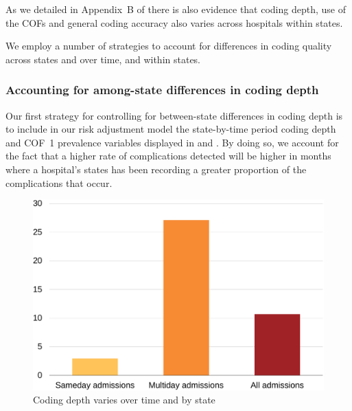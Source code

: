 \documentclass[submission]{grattan}
\begin{document}
As we detailed in Appendix~B of  there is also evidence that coding depth, use of the COFs and general coding accuracy also varies across hospitals within states.%

We employ a number of strategies to account for differences in coding quality across states and over time, and within states.

\subsubsection{Accounting for among-state differences in coding depth}\label{subsubsec:accounting-for-among-state-differences-in-coding-depth}

Our first strategy for controlling for between-state differences in coding depth is to include in our risk adjustment model the state-by-time period coding depth and COF~1 prevalence variables displayed in  and .
By doing so, we account for the fact that a higher rate of complications detected will be higher in months where a hospital's states has been recording a greater proportion of the complications that occur.

\begin{figure}
\caption{Coding depth varies over time and by state}\label{fig:coding-depth-varies-over-time-and-by-state}
\includegraphics[page=23]{atlas/comps_charts.pdf}
\end{figure}
\end{document}
